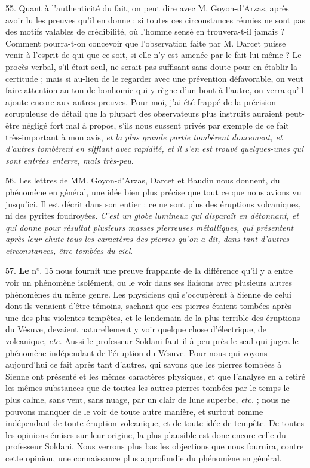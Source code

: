 \documentclass[a4paper, 11pt, oneside, polutonikogreek, french]{article}
\begin{document}
55. Quant à l'authenticité du fait, on peut dire avec M. Goyon-d'Arzas, après avoir lu les preuves qu'il en donne : \og si toutes ces circonstances réunies ne sont pas des motifs valables de crédibilité, où l'homme sensé en trouvera-t-il jamais ? \fg Comment pourra-t-on concevoir que l'observation faite par M. Darcet puisse venir à l'esprit de qui que ce soit, si elle n'y est amenée par le fait lui-même ? Le procès-verbal, s'il était seul, ne serait pas suffisant sans doute pour en établir la certitude ; mais si au-lieu de le regarder avec une prévention défavorable, on veut faire attention au ton de bonhomie qui y règne d'un bout à l'autre, on verra qu'il ajoute encore aux autres preuves. Pour moi, j'ai été frappé de la précision scrupuleuse de détail que la plupart des observateurs plus instruits auraient peut-être négligé fort mal à propos, s'ils nous eussent privés par exemple de ce fait très-important à mon avis, \emph{et la plus grande partie tombèrent doucement, et d'autres tombèrent en sifflant avec rapidité, et il s'en est trouvé quelques-unes qui sont entrées enterre, mais très-peu}.

56. Les lettres de MM. Goyon-d'Arzas, Darcet et Baudin nous donnent, du phénomène en général, une idée bien plus précise que tout ce que nous avions vu jusqu'ici. Il est décrit dans son entier : ce ne sont plus des éruptions volcaniques, ni des pyrites foudroyées. \emph{C'est un globe lumineux qui disparaît en détonnant, et qui donne pour résultat plusieurs masses pierreuses métalliques, qui présentent après leur chute tous les caractères des pierres qu'on a dit, dans tant d'autres circonstances, être tombées du ciel}.

57. \textbf{Le} n°. 15 nous fournit une preuve frappante de la différence qu'il y a entre voir un phénomène isolément, ou le voir dans ses liaisons avec plusieurs autres phénomènes du même genre. Les physiciens qui s'occupèrent à Sienne de celui dont ils venaient d'être témoins, sachant que ces pierres étaient tombées après une des plus violentes tempêtes, et le lendemain de la plus terrible des éruptions du Vésuve, devaient naturellement y voir quelque chose d'électrique, de volcanique, \emph{etc.} Aussi le professeur Soldani faut-il à-peu-près le seul qui jugea le phénomène indépendant de l'éruption du Vésuve. Pour nous qui voyons aujourd'hui ce fait après tant d'autres, qui savons que les pierres tombées à Sienne ont présenté et les mêmes caractères physiques, et que l'analyse en a retiré les mêmes substances que de toutes les autres pierres tombées par le temps le plus calme, sans vent, sans nuage, par un clair de lune superbe, \emph{etc.} ; nous ne pouvons manquer de le voir de toute autre manière, et surtout comme indépendant de toute éruption volcanique, et de toute idée de tempête. De toutes les opinions émises sur leur origine, la plus plausible est donc encore celle du professeur Soldani. Nous verrons plus bas les objections que nous fournira, contre cette opinion, une connaissance plus approfondie du phénomène en général.
\end{document}
